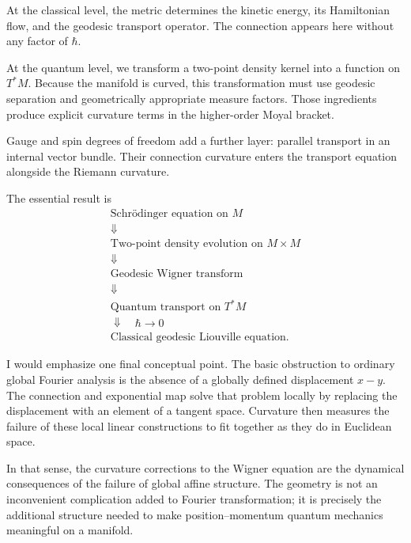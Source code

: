 At the classical level, the metric determines the kinetic energy, its Hamiltonian flow, and the geodesic transport operator. The connection appears here without any factor of \(\hbar\).

At the quantum level, we transform a two-point density kernel into a function on \(T^*M\). Because the manifold is curved, this transformation must use geodesic separation and geometrically appropriate measure factors. Those ingredients produce explicit curvature terms in the higher-order Moyal bracket.

Gauge and spin degrees of freedom add a further layer: parallel transport in an internal vector bundle. Their connection curvature enters the transport equation alongside the Riemann curvature.

The essential result is
\[
\boxed{
\begin{gathered}
\text{Schrödinger equation on }M\\
\Downarrow\\
\text{Two-point density evolution on }M\times M\\
\Downarrow\\
\text{Geodesic Wigner transform}\\
\Downarrow\\
\text{Quantum transport on }T^*M\\
\Downarrow\quad\hbar\to0\\
\text{Classical geodesic Liouville equation}.
\end{gathered}
}
\]

I would emphasize one final conceptual point. The basic obstruction to ordinary global Fourier analysis is the absence of a globally defined displacement \(x-y\). The connection and exponential map solve that problem locally by replacing the displacement with an element of a tangent space. Curvature then measures the failure of these local linear constructions to fit together as they do in Euclidean space.

In that sense, the curvature corrections to the Wigner equation are the dynamical consequences of the failure of global affine structure. The geometry is not an inconvenient complication added to Fourier transformation; it is precisely the additional structure needed to make position–momentum quantum mechanics meaningful on a manifold.
